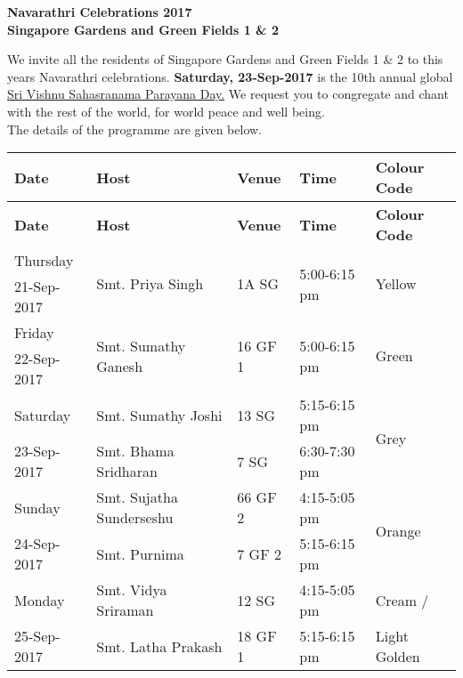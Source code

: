 \documentclass[12pt]{article}
\begin{document}
\pagestyle{empty}
\begin{center}
\textbf{Navarathri Celebrations 2017\\Singapore Gardens and Green Fields 1 \& 2}\\
\end{center}
We invite all the residents of Singapore Gardens and Green Fields 1 \& 2 to this year\textquotesingle s Navarathri celebrations. \textbf{Saturday, 23-Sep-2017} is the 10th annual global  \underline{\textquotesingle Sri Vishnu Sahasranama Parayana Day\textquotesingle .} We request you to congregate and chant with the rest of the world, for world peace and well being. \\The details of the programme are given below. 
\begin{center}
\begin{longtable}{|p{}|p{}|p{}|p{}|p{}|}
\hline \textbf{Date}&\textbf{Host}&\textbf{Venue}&\textbf{Time}&\textbf{Colour Code}\\\hline
\endfirsthead
\hline \textbf{Date}&\textbf{Host}&\textbf{Venue}&\textbf{Time}&\textbf{Colour Code}\\\hline
\endhead

Thursday&\multirow{2}{*}{Smt. Priya Singh}&\multirow{2}{*}{1A SG}&\multirow{2}{*}{5:00-6:15 pm}&\multirow{2}{*}{Yellow}\\
21-Sep-2017&&&&\\\hline

Friday&\multirow{2}{*}{Smt. Sumathy Ganesh}&\multirow{2}{*}{16 GF 1}&\multirow{2}{*}{5:00-6:15 pm}&\multirow{2}{*}{Green}\\
22-Sep-2017&&&&\\\hline\hline

Saturday &Smt. Sumathy Joshi&13 SG&5:15-6:15 pm&\multirow{2}{*}{Grey}\\\cline{2-4}
23-Sep-2017&Smt. Bhama Sridharan&7 SG&6:30-7:30 pm&\\\hline\hline

Sunday &Smt. Sujatha Sunderseshu&66 GF 2&4:15-5:05 pm&\multirow{2}{*}{Orange}\\\cline{2-4}
24-Sep-2017&Smt. Purnima&7 GF 2&5:15-6:15 pm&\\\hline

Monday &Smt. Vidya Sriraman&12 SG&4:15-5:05 pm&Cream / \\\cline{2-4}
25-Sep-2017&Smt. Latha Prakash&18 GF 1&5:15-6:15 pm&Light Golden\\\hline


\end{longtable}
\end{center}
\end{document}
